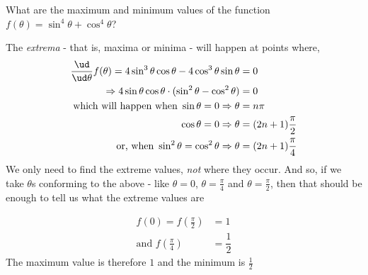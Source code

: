 

\question[3] What are the maximum and minimum values of the function $f(\theta) = \sin^4\theta + \cos^4\theta$?


\ifprintanswers
\fi 

\begin{solution}[\fullpage]
  The \textit{extrema} - that is, maxima or minima - will happen at points where,
  \begin{align}
     \dfrac{\ud}{\ud\theta}f(\theta) = 4\sin^3\theta\cos\theta - 4\cos^3\theta\sin\theta &= 0\\
        \Rightarrow 4\sin\theta\cos\theta\cdot(\sin^2\theta - \cos^2\theta) &= 0 \\
        \text{which will happen when } \sin\theta = 0 \Rightarrow \theta &= n\pi \\
              \cos\theta = 0 \Rightarrow \theta &= (2n+1)\frac{\pi}{2} \\
        \text{or, when } \sin^2\theta = \cos^2\theta \Rightarrow \theta &= (2n+1)\frac{\pi}{4}
  \end{align}
  We only need to find the extreme values, \textit{not} where they occur. And so, if we take $\theta$s
  conforming to the above - like $\theta = 0$, $\theta = \frac{\pi}{4}$ and $\theta = \frac{\pi}{2}$, then
  that should be enough to tell us what the extreme values are
  
  \begin{align}
     f(0) = f(\frac{\pi}{2}) &= 1 \\
     \text{and } f(\frac{\pi}{4}) &= \dfrac{1}{2}
  \end{align}
  The maximum value is therefore $1$ and the minimum is $\frac{1}{2}$
\end{solution}
